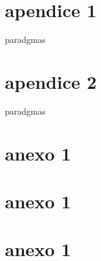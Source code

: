 \documentclass[
	12pt,				%
	openright,			%
	twoside,			%
	a4paper,			%
	english,			%
	brazil,				%
	]{abntex2}
\begin{document}
\postextual






\begin{apendicesenv}

\chapter{apendice 1}

paradgmas

\chapter{apendice 2}

paradgmas

\end{apendicesenv}



\begin{anexosenv}


\chapter{anexo 1}


\chapter{anexo 1}


\chapter{anexo 1}


\end{anexosenv}


\printindex
\end{document}
